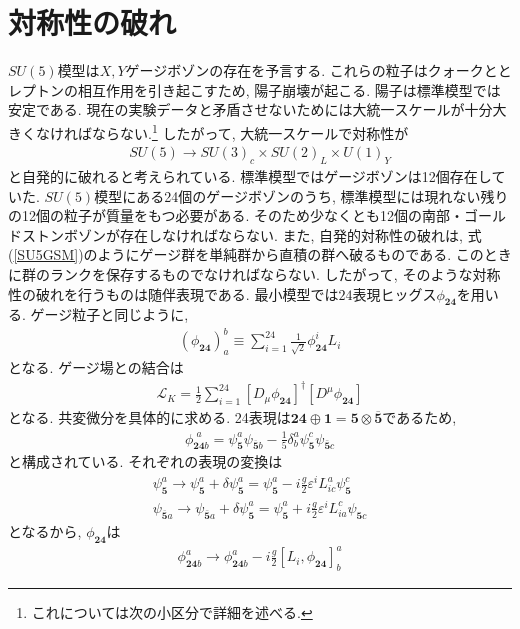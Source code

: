 \section{対称性の破れ}
$SU(5)$模型は$X, Y$ゲージボゾンの存在を予言する.
これらの粒子はクォークととレプトンの相互作用を引き起こすため, 陽子崩壊が起こる.
陽子は標準模型では安定である.
現在の実験データと矛盾させないためには大統一スケールが十分大きくなければならない.\footnote{これについては次の小区分で詳細を述べる.}
したがって, 大統一スケールで対称性が
\begin{align}
  SU(5)\rightarrow SU(3)_c\times SU(2)_L\times U(1)_Y\label{SU5GSM}
\end{align}
と自発的に破れると考えられている.
標準模型ではゲージボゾンは12個存在していた.
$SU(5)$模型にある24個のゲージボゾンのうち, 標準模型には現れない残りの12個の粒子が質量をもつ必要がある.
そのため少なくとも12個の南部・ゴールドストンボゾンが存在しなければならない.
また, 自発的対称性の破れは, 式(\ref{SU5GSM})のようにゲージ群を単純群から直積の群へ破るものである.
このときに群のランクを保存するものでなければならない.
したがって, そのような対称性の破れを行うものは随伴表現である.
最小模型では$24$表現ヒッグス$\phi_{\bm{24}}$を用いる.
ゲージ粒子と同じように, 
\begin{align}
  (\phi_{\bm{24}})_a^b \equiv \sum_{i=1}^{24}\frac{1}{\sqrt{2}}\phi_{\bm{24}}^i L_i
\end{align}
となる.
ゲージ場との結合は
\begin{align}
\mathcal{L}_K = \frac{1}{2}\sum_{i=1}^{24}[D_\mu\phi_{\bm{24}}]^\dagger [D^\mu\phi_{\bm{24}}]\nonumber
\end{align}
となる.
共変微分を具体的に求める.
24表現は$\bm{24}\oplus \bm{1} = \bm{5}\otimes \overline{\bm{5}}$であるため,
\begin{align}
  \phi_{\bm{24}b}^{\,\,a} = \psi_{\bm{5}}^a \psi_{\bm{\overline{5}}b} -\frac{1}{5}\delta^a_b \psi^c_{\bm{5}}\psi_{\bm{\bar{5}}c}
\end{align}
と構成されている.
それぞれの表現の変換は
\begin{align}
  \psi_{\bm{5}}^a \rightarrow \psi^a_{\bm{5}}+\delta \psi_{\bm{5}}^a = \psi_{\bm{5}}^a -i\frac{g}{2}\varepsilon^i L^a_{ic}\psi_{\bm{5}}^c \nonumber\\
  \psi_{\bm{\overline{5}}a} \rightarrow \psi_{\bm{\bar{5}}a}+\delta \psi_{\bm{5}}^a = \psi_{\bm{5}}^a +i\frac{g}{2}\varepsilon^i L^c_{ia}\psi_{\bm{5}c}\nonumber
\end{align}
となるから, $\phi_{\bm{24}}$は
\begin{align}
  \phi_{\bm{24}b}^a \rightarrow \phi_{\bm{24}b}^a -i\frac{g}{2}[L_i,\phi_{\bm{24}}]^a_b
\end{align}
